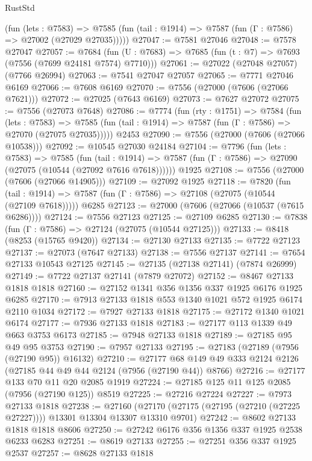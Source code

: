 \begin{lexlean}{RustStd}
\begin{coremodule}
{\begin{coremodule}
{{{{{{{{{{{{{{{{{{{{{{{{{{{{{{{{{{{{{{{{{{{      (fun (lets : @7583) =>
      @7585 (fun (tail : @1914) => @7587 (fun (Γ : @7586) => @27002 (@27029 @27035)))))
@27047 := @7581 @27046
@27048 := @7578 @27047
@27057 := @7684
    (fun (U : @7683) => @7685 (fun (t : @7) => @7693 (@7556 (@7699 @24181 @7574) @7710)))
@27061 := @27022 (@27048 @27057) (@7766 @26994)
@27063 := @7541 @27047 @27057
@27065 := @7771 @27046 @6169
@27066 := @7608 @6169
@27070 := @7556 (@27000 (@7606 (@27066 @7621)))
@27072 := @27025 (@7643 @6169)
@27073 := @7627 @27072
@27075 := @7556 (@27073 @7648)
@27086 := @7774
    (fun (rty : @1751) =>
    @7584
      (fun (lets : @7583) =>
      @7585 (fun (tail : @1914) => @7587 (fun (Γ : @7586) => @27070 (@27075 @27035)))))
    @2453
@27090 := @7556 (@27000 (@7606 (@27066 @10538)))
@27092 := @10545 @27030 @24184
@27104 := @7796
    (fun (lets : @7583) =>
    @7585
      (fun (tail : @1914) =>
      @7587 (fun (Γ : @7586) => @27090 (@27075 (@10544 (@27092 @7616 @7618))))))
    @1925
@27108 := @7556 (@27000 (@7606 (@27066 @14905)))
@27109 := @27092 @1925
@27118 := @7820
    (fun (tail : @1914) => @7587 (fun (Γ : @7586) => @27108 (@27075 (@10544 (@27109 @7618)))))
    @6285
@27123 := @27000 (@7606 (@27066 (@10537 (@7615 @6286))))
@27124 := @7556 @27123
@27125 := @27109 @6285
@27130 := @7838 (fun (Γ : @7586) => @27124 (@27075 (@10544 @27125)))
@27133 := @8418 (@8253 (@15765 @9420))
@27134 := @27130 @27133
@27135 := @7722 @27123
@27137 := @27073 (@7647 @27133)
@27138 := @7556 @27137
@27141 := @7654 @27133 @10543 @27125
@27145 := @27135 (@27138 @27141) (@7874 @26999)
@27149 := @7722 @27137 @27141 (@7879 @27072)
@27152 := @8467 @27133 @1818 @1818
@27160 := @27152 @1341 @356 @1356 @337 @1925 @6176 @1925 @6285
@27170 := @7913 @27133 @1818 @553 @1340 @1021 @572 @1925 @6174 @2110 @1034
@27172 := @7927 @27133 @1818
@27175 := @27172 @1340 @1021 @6174
@27177 := @7936 @27133 @1818
@27183 := @27177 @113 @1339 @49 @663 @3753 @6173
@27185 := @7948 @27133 @1818
@27189 := @27185 @95 @49 @95 @3753
@27190 := @7957 @27133
@27195 := @27183 (@27189 (@7956 (@27190 @95)) @16132)
@27210 := @27177 @68 @149 @49 @333 @2124 @2126 (@27185 @44 @49 @44 @2124 (@7956 (@27190 @44)) @8766)
@27216 := @27177 @133 @70 @11 @20 @2085 @1919
@27224 := @27185 @125 @11 @125 @2085 (@7956 (@27190 @125)) @8519
@27225 := @27216 @27224
@27227 := @7973 @27133 @1818
@27238 := @27160
    (@27170 (@27175 (@27195 (@27210 (@27225 @27227)))) @13301 @13304 @13307 @13310 @9701)
@27242 := @8602 @27133 @1818 @1818 @8606
@27250 := @27242 @6176 @356 @1356 @337 @1925 @2538 @6233 @6283
@27251 := @8619 @27133
@27255 := @27251 @356 @337 @1925 @2537
@27257 := @8628 @27133 @1818
}}}}}}}}}}}}}}}}}}}}}}}}}}}}}}}}}}}}}}}}}}}
\end{coremodule}}
\end{coremodule}
\end{lexlean}
